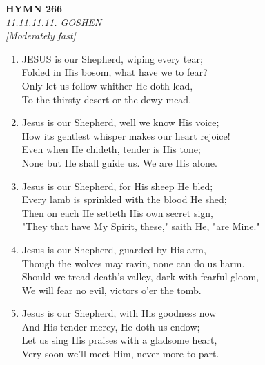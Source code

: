 \documentclass[11pt,a4paper]{article}
\begin{document}
\newpage
\begin{center}
    {\Large \textbf{HYMN 266}}
    \\
    \textit{11.11.11.11. GOSHEN}
    \\
    \textit{\small [Moderately fast]}
\end{center}
\vspace{1em}

\begin{enumerate}
    \item JESUS is our Shepherd, wiping every tear; \\
        Folded in His bosom, what have we to fear? \\
        Only let us follow whither He doth lead, \\
        To the thirsty desert or the dewy mead.

    \item Jesus is our Shepherd, well we know His voice; \\
        How its gentlest whisper makes our heart rejoice! \\
        Even when He chideth, tender is His tone; \\
        None but He shall guide us. We are His alone.

    \item Jesus is our Shepherd, for His sheep He bled; \\
        Every lamb is sprinkled with the blood He shed; \\
        Then on each He setteth His own secret sign, \\
        "They that have My Spirit, these," saith He, "are Mine."

    \item Jesus is our Shepherd, guarded by His arm, \\
        Though the wolves may ravin, none can do us harm. \\
        Should we tread death's valley, dark with fearful gloom, \\
        We will fear no evil, victors o'er the tomb.

    \item Jesus is our Shepherd, with His goodness now \\
        And His tender mercy, He doth us endow; \\
        Let us sing His praises with a gladsome heart, \\
        Very soon we'll meet Him, never more to part.

\end{enumerate}
\end{document}
